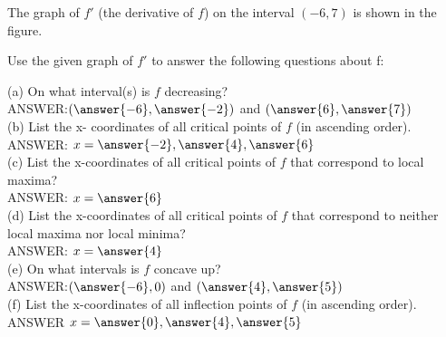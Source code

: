 \documentclass{ximera}
\begin{document}
\begin{exercise}
The graph of $f'$ (the derivative of $f$) on the interval $(-6,7)$ is shown in the figure.

\begin{image}
\end{image}



Use the given graph of $f'$ to answer the following questions about f:

(a) On what interval(s) is $f$ decreasing?\\

ANSWER:$(\answer{-6},\answer{-2})$ and $(\answer{6},\answer{7})$\\

(b) List the x- coordinates of all critical points of $f$ (in ascending order). \\

ANSWER: $x=\answer{-2},\answer{4},\answer{6}$\\

(c) List the x-coordinates of all critical points of $f$ that correspond to local maxima?\\

 ANSWER: $x=\answer{6}$\\

(d)  List the x-coordinates of all critical points of $f$ that correspond to neither local maxima nor local minima? \\

ANSWER: $x=\answer{4}$\\

(e) On what intervals is $f$ concave up?\\

  ANSWER:$(\answer{-6},0)$ and $(\answer{4},\answer{5})$\\

(f) List the x-coordinates of  all inflection points of $f$ (in ascending order). \\

ANSWER $x=\answer{0},\answer{4},\answer{5}$\\
\end{exercise}
\end{document}
